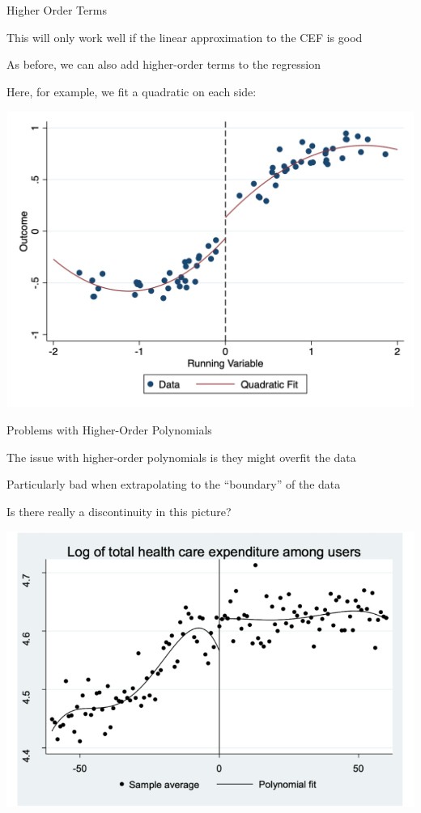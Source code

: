 \documentclass[11pt,english,handout]{beamer}
\newenvironment{wideitemize}{\itemize\addtolength{\itemsep}{10pt}}{\enditemize}
\begin{document}
\begin{frame}{Higher Order Terms}
	\begin{wideitemize}
		\item
		This will only work well if the linear approximation to the CEF is good 
		
		\pause
		\item
		As before, we can also add higher-order terms to the regression
		
		\pause
		\item
		Here, for example, we fit a quadratic on each side:
		\begin{center}
		\includegraphics[width = 0.7\linewidth]{rd_quad}
		\end{center}
		
	\end{wideitemize}
\end{frame}

\begin{frame}{Problems with Higher-Order Polynomials}
	\begin{wideitemize}
		\item
		The issue with higher-order polynomials is they might overfit the data
			\begin{wideitemize}
				\item
				Particularly bad when extrapolating to the ``boundary'' of the data
			\end{wideitemize}
		
		\pause
		\item
		Is there really a discontinuity in this picture? 
		\begin{center}
		\includegraphics[width = 0.7 \linewidth]{rd-over-fitting}
		\end{center}
	\end{wideitemize}
\end{frame}
\end{document}
